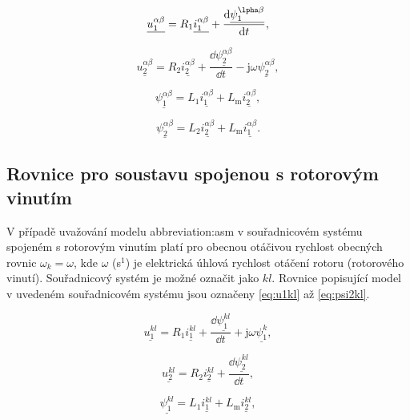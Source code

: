 \documentclass[a4paper, twoside, 11pt]{article}
\begin{document}
 \begin{equation}\label{eq:u1alphabeta}
     \underline{u_{1}^{\alpha\beta}} = R_1 \underline{i_1^{\alpha\beta}} + \frac{\dd{\underline{\psi_1^{\lpha\beta}}}}{\dd{t}},
    \end{equation}

    \begin{equation}
        \underline{u_{2}^{\alpha\beta}} = R_2 \underline{i_2^{\alpha\beta}} + \frac{\dd{\underline{\psi_2^{\alpha\beta}}}}{\dd{t}} - \text{j} \omega \underline{\psi_2^{\alpha\beta}},
    \end{equation}

    \begin{equation}
        \underline{\psi_1^{\alpha\beta}} = L_1 \underline{i_1^{\alpha\beta}} + L_\text{m} \underline{i_2^{\alpha\beta}},
    \end{equation}

    \begin{equation}\label{eq:psi2alphabeta}
        \underline{\psi_2^{\alpha\beta}} = L_2 \underline{i_2^{\alpha\beta}} + L_\text{m} \underline{i_1^{\alpha\beta}}.
    \end{equation}
    \subsection{Rovnice pro soustavu spojenou s rotorovým vinutím}
    V případě uvažování modelu \gls{abbreviation:asm} v souřadnicovém systému spojeném s rotorovým vinutím platí pro obecnou otáčivou rychlost obecných rovnic $\omega_k = \omega$, kde $\omega$ (s$^{1}$) je elektrická úhlová rychlost otáčení rotoru (rotorového vinutí). Souřadnicový systém je možné označit jako $kl$. Rovnice popisující model v uvedeném souřadnicovém systému jsou označeny \ref{eq:u1kl} až \ref{eq:psi2kl}.\par

 \begin{equation}\label{eq:u1kl}
     \underline{u_{1}^{kl}} = R_1 \underline{i_1^{kl}} + \frac{\dd{\underline{\psi_1^{kl}}}}{\dd{t}} + \text{j} \omega \underline{\psi_1^{k}},
    \end{equation}

    \begin{equation}
        \underline{u_{2}^{kl}} = R_2 \underline{i_2^{kl}} + \frac{\dd{\underline{\psi_2^{kl}}}}{\dd{t}},
    \end{equation}

    \begin{equation}
        \underline{\psi_1^{kl}} = L_1 \underline{i_1^{kl}} + L_\text{m} \underline{i_2^{kl}},
    \end{equation}
\end{document}
